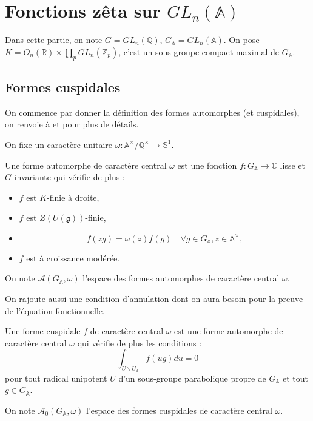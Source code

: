 \section{Fonctions zêta sur $GL_n(\mathbb{A})$}

Dans cette partie, on note $G = GL_n(\mathbb{Q})$, $G_\mathbb{A}=GL_n(\mathbb{A})$. On pose $K = O_n(\mathbb{R}) \times \prod_p GL_n(\mathbb{Z}_p)$, c'est un sous-groupe compact maximal de $G_\mathbb{A}$.

\subsection{Formes cuspidales}
On commence par donner la définition des formes automorphes (et cuspidales), on renvoie à \cite{bump} et \cite{goldfeld-hundley} pour plus de détails.

On fixe un caractère unitaire $\omega : \mathbb{A}^\times/\mathbb{Q}^\times \rightarrow \mathbb{S}^1$.

\begin{definition}
Une forme automorphe de caractère central $\omega$ est une fonction $f : G_\mathbb{A} \rightarrow \mathbb{C}$ lisse et $G$-invariante qui vérifie de plus :
\begin{itemize}
\item $f$ est $K$-finie à droite,
\item $f$ est $Z(U(\mathfrak{g}))$-finie,
\item \begin{equation}
f(zg) = \omega(z)f(g) \quad \forall g \in G_\mathbb{A}, z \in \mathbb{A}^\times,
\end{equation}
\item $f$ est à croissance modérée.
\end{itemize}

On note $\mathcal{A}(G_\mathbb{A}, \omega)$ l'espace des formes automorphes de caractère central $\omega$.
\end{definition}

On rajoute aussi une condition d'annulation dont on aura besoin pour la preuve de l'équation fonctionnelle.
\begin{definition}
Une forme cuspidale $f$ de caractère central $\omega$ est une forme automorphe de caractère central $\omega$ qui vérifie de plus les conditions :
\begin{equation}
\int_{U \backslash U_\mathbb{A}} f(ug) du = 0
\end{equation}
pour tout radical unipotent $U$ d'un sous-groupe parabolique propre de $G_\mathbb{A}$ et tout $g \in G_\mathbb{A}$.

On note $\mathcal{A}_0(G_\mathbb{A}, \omega)$ l'espace des formes cuspidales de caractère central $\omega$.
\end{definition}

